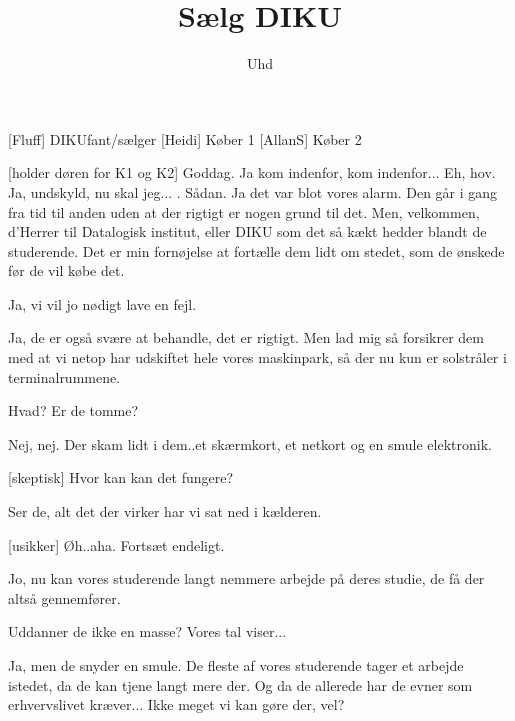 \documentclass[a4paper,11pt]{article}
\title{Sælg DIKU}
\author{Uhd}
\begin{document}
\maketitle

\begin{roles}
[Fluff] DIKUfant/sælger
[Heidi] Køber 1
[AllanS] Køber 2
\end{roles}

\begin{props}
\end{props}

  
\begin{sketch}

[holder døren for K1 og K2] Goddag. Ja kom indenfor, kom
indenfor... Eh, hov. Ja, undskyld, nu
skal jeg... . Sådan. Ja det var
blot vores alarm. Den går i gang fra tid til anden uden at der rigtigt er nogen
grund til det. Men, velkommen, d'Herrer til Datalogisk institut, eller DIKU som
det så kækt hedder blandt de studerende. Det er min fornøjelse at fortælle dem
lidt om stedet, som de ønskede før de vil købe det.

 Ja, vi vil jo nødigt lave en fejl.

 Ja, de er også svære at behandle, det er rigtigt. Men lad mig så
forsikrer dem med at vi netop har udskiftet hele vores maskinpark, så der
nu kun er solstråler i terminalrummene.

 Hvad? Er de tomme?

 Nej, nej. Der skam lidt i dem..et skærmkort, et netkort og en smule
elektronik.

[skeptisk] Hvor kan kan det fungere?

 Ser de, alt det der virker har vi sat ned i kælderen.

[usikker] Øh..aha. Fortsæt endeligt.

 Jo, nu kan vores studerende langt nemmere arbejde på deres studie, de
få der altså gennemfører.

 Uddanner de ikke en masse? Vores tal viser...

 Ja, men de snyder en smule. De fleste af vores studerende tager et
arbejde istedet, da de kan tjene langt mere der. Og da de allerede har de
evner som erhvervslivet kræver... Ikke meget vi kan
gøre der, vel?


\end{sketch}
\end{document}
